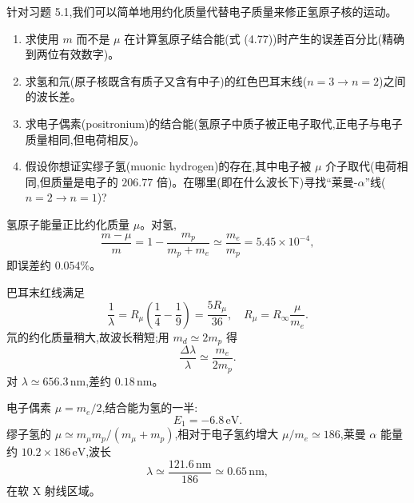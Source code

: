 \begin{question}
针对习题 5.1,我们可以简单地用约化质量代替电子质量来修正氢原子核的运动。
\begin{enumerate}
\item 求使用 $m$ 而不是 $\mu$ 在计算氢原子结合能(式 (4.77))时产生的误差百分比(精确到两位有效数字)。
\item 求氢和氘(原子核既含有质子又含有中子)的红色巴耳末线($n=3\to n=2$)之间的波长差。
\item 求电子偶素(positronium)的结合能(氢原子中质子被正电子取代,正电子与电子质量相同,但电荷相反)。
\item 假设你想证实缪子氢(muonic hydrogen)的存在,其中电子被 $\mu$ 介子取代(电荷相同,但质量是电子的 $206.77$ 倍)。在哪里(即在什么波长下)寻找“莱曼-$\alpha$”线($n=2\to n=1$)?
\end{enumerate}

\par\smallskip
{}

\end{question}
\begin{solution}

氢原子能量正比约化质量 $\mu$。对氢,
\[
\frac{m-
\mu}{m}=1-\frac{m_p}{m_p+m_e}\simeq \frac{m_e}{m_p}=5.45\times10^{-4},
\]
即误差约 $0.054\%$。

巴耳末红线满足
\[
\frac1\lambda=R_\mu\left(\frac14-\frac19\right)=\frac{5R_\mu}{36},
\quad R_\mu=R_\infty\frac{\mu}{m_e}.
\]
氘的约化质量稍大,故波长稍短;用 $m_d\simeq2m_p$ 得
\[
\frac{\Delta\lambda}{\lambda}\simeq \frac{m_e}{2m_p}.
\]
对 $\lambda\simeq656.3\,\mathrm{nm}$,差约 $0.18\,\mathrm{nm}$。

电子偶素 $\mu=m_e/2$,结合能为氢的一半:
\[
E_1=-6.8\,\mathrm{eV}.
\]
缪子氢的 $\mu\simeq m_\mu m_p/(m_\mu+m_p)$,相对于电子氢约增大 $\mu/m_e\simeq186$,莱曼 $\alpha$ 能量约 $10.2\times186\,\mathrm{eV}$,波长
\[
\lambda\simeq\frac{121.6\,\mathrm{nm}}{186}\simeq0.65\,\mathrm{nm},
\]
在软 X 射线区域。

\end{solution}

